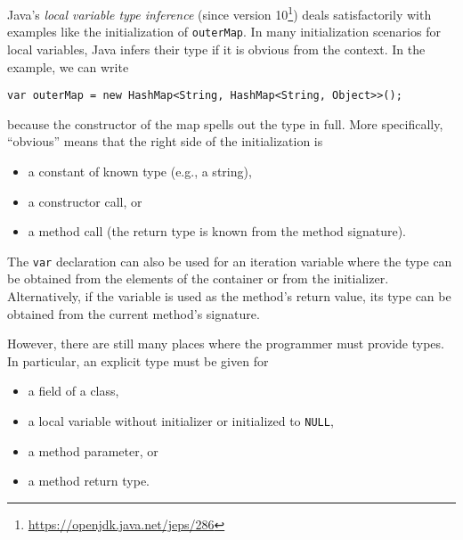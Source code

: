 Java's \emph{local variable type inference} (since version 10\footnote{\url{https://openjdk.java.net/jeps/286}}) deals
satisfactorily with examples like the initialization of
\lstinline{outerMap}. 
In many initialization scenarios for local variables, Java infers their type
if it is obvious from the context. In the
example, we can write
\begin{lstlisting}[basicstyle=\ttfamily\fontsize{8}{9.6}\selectfont,style=fgj]
var outerMap = new HashMap<String, HashMap<String, Object>>();
\end{lstlisting}
because the constructor of the map spells out the type in
full. More specifically, ``obvious'' means that the right side of the initialization is
\begin{itemize}
\item a constant of known type (e.g., a string),
\item a constructor call, or
\item a method call (the return type is known from the method
  signature).
\end{itemize}
The \lstinline{var} declaration can also be used for an iteration
variable where the type can be obtained from the elements of the
container or from the initializer.
Alternatively, if the variable is used as the method's return value,
its type can be obtained from the current method's signature.

However, there are still many places where the programmer must provide types. In
particular, an explicit type must be given for
\begin{itemize}
\item a field of a class,
\item a local variable without initializer or initialized to \lstinline{NULL},
\item a method parameter, or
\item a method return type.
\end{itemize}

